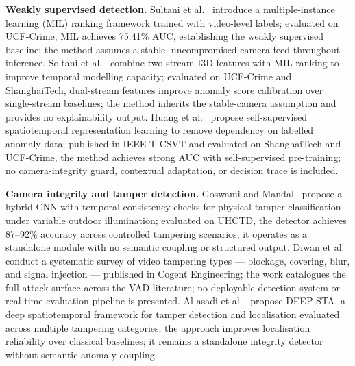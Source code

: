 \documentclass[a4paper,fleqn]{cas-dc}
\begin{document}
\textbf{Weakly supervised detection.}
Sultani et al.~\citep{sultani2018realworld} introduce a multiple-instance learning (MIL) ranking framework trained with video-level labels; evaluated on UCF-Crime, MIL achieves 75.41\% AUC, establishing the weakly supervised baseline; the method assumes a stable, uncompromised camera feed throughout inference.
Soltani et al.~\citep{soltani2024i3dAnomaly} combine two-stream I3D features with MIL ranking to improve temporal modelling capacity; evaluated on UCF-Crime and ShanghaiTech, dual-stream features improve anomaly score calibration over single-stream baselines; the method inherits the stable-camera assumption and provides no explainability output.
Huang et al.~\citep{huang2024selfsupervised} propose self-supervised spatiotemporal representation learning to remove dependency on labelled anomaly data; published in IEEE T-CSVT and evaluated on ShanghaiTech and UCF-Crime, the method achieves strong AUC with self-supervised pre-training; no camera-integrity guard, contextual adaptation, or decision trace is included.
 
\textbf{Camera integrity and tamper detection.}
Goswami and Mandal~\citep{goswami2023hybrid} propose a hybrid CNN with temporal consistency checks for physical tamper classification under variable outdoor illumination; evaluated on UHCTD, the detector achieves 87--92\% accuracy across controlled tampering scenarios; it operates as a standalone module with no semantic coupling or structured output.
Diwan et al.~\citep{diwan2024systematic} conduct a systematic survey of video tampering types — blockage, covering, blur, and signal injection — published in Cogent Engineering; the work catalogues the full attack surface across the VAD literature; no deployable detection system or real-time evaluation pipeline is presented.
Al-asadi et al.~\citep{deepsta2024} propose DEEP-STA, a deep spatiotemporal framework for tamper detection and localisation evaluated across multiple tampering categories; the approach improves localisation reliability over classical baselines; it remains a standalone integrity detector without semantic anomaly coupling.
 
\end{document}
